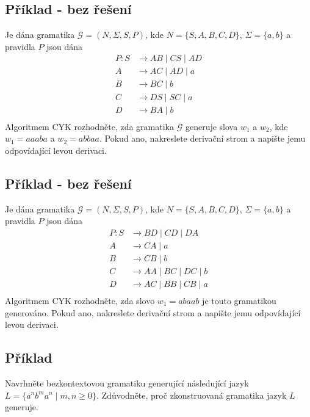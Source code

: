 \subsection{Příklad - bez řešení} %
Je dána gramatika $\mathcal{G} = (N, \Sigma, S, P)$, kde $N = \{S,A,B,C,D\}$, $\Sigma = \{a,b\}$ a pravidla $P$ 
jsou dána
\begin{align*}
  P:  S & \rightarrow AB \mid CS \mid AD \\
    A & \rightarrow AC \mid AD \mid a \\
    B & \rightarrow BC \mid b \\ 
    C & \rightarrow DS \mid SC \mid a \\
    D & \rightarrow BA \mid b \\
\end{align*}
Algoritmem CYK rozhodněte, zda gramatika $\mathcal{G}$ generuje slova $w_1$ a $w_2$, kde $w_1 = aaaba$ a 
$w_2 = abbaa$. Pokud ano, nakreslete derivační strom a napište jemu odpovídající levou derivaci.

\shrug


\subsection{Příklad - bez řešení}
Je dána gramatika $\mathcal{G} = (N, \Sigma, S, P)$, kde $N = \{S,A,B,C,D\}$, $\Sigma = \{a,b\}$ a pravidla $P$ 
jsou dána
\begin{align*}
  P:  S & \rightarrow BD \mid CD \mid DA \\
    A & \rightarrow CA \mid a \\
    B & \rightarrow CB \mid b \\ 
    C & \rightarrow AA \mid BC \mid DC \mid b \\
    D & \rightarrow AC \mid BB \mid CB \mid a \\
\end{align*}
Algoritmem CYK rozhodněte, zda slovo $w_1 = abaab$ je touto gramatikou generováno. Pokud ano, nakreslete derivační 
strom a napište jemu odpovídající levou derivaci.

\shrug

\subsection{Příklad}  %

Navrhněte bezkontextovou gramatiku generující následující jazyk $L = \{a^nb^ma^n \mid m, n \geq 0\}$. Zdůvodněte, 
proč zkonstruovaná gramatika jazyk $L$ generuje.


